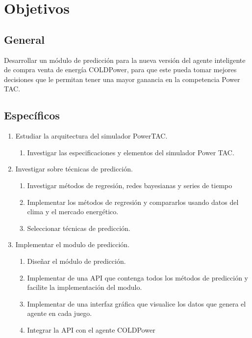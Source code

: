 \section{Objetivos}
\subsection{General}
Desarrollar un módulo de predicción para la nueva versión del agente inteligente de compra venta de energía COLDPower, para que este pueda tomar mejores decisiones que le permitan tener una mayor ganancia en la competencia Power TAC.
\subsection{Específicos}
\renewcommand{\labelenumi}{$\bullet$ }
\renewcommand{\labelenumii}{\alph{enumii})}
\begin{enumerate}
    \item Estudiar la arquitectura del simulador PowerTAC. 
    \begin{enumerate}
        \item Investigar las especificaciones y elementos del simulador Power TAC.
    \end{enumerate} 
    \item Investigar sobre técnicas de predicción.
    \begin{enumerate}
        \item Investigar métodos de regresión, redes bayesianas y series de tiempo
		\item Implementar los métodos de regresión y compararlos usando datos del clima y el mercado energético.
		\item Seleccionar técnicas de predicción.
    \end{enumerate}
    \item Implementar el modulo de predicción.
        \begin{enumerate}
        \item Diseñar el módulo de predicción.
		\item Implementar de una API que contenga todos los métodos de predicción y facilite la implementación del modulo.
		\item Implementar de una interfaz gráfica que visualice los datos que genera el agente en cada juego.
		\item Integrar la API con el agente COLDPower
    \end{enumerate}
\end{enumerate}

